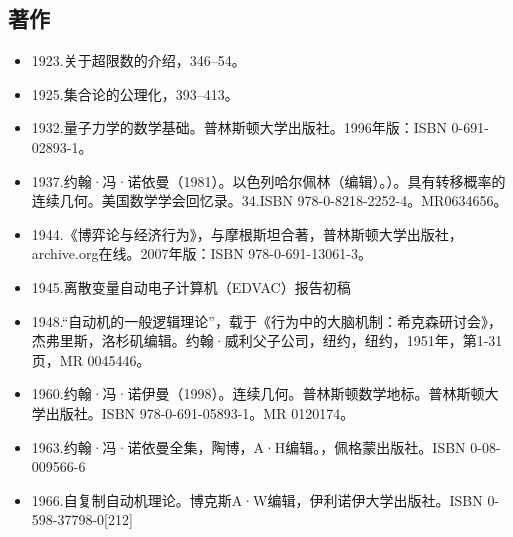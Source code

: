 \subsection{著作}
\begin{itemize}
\item 1923.关于超限数的介绍，346–54。
\item 1925.集合论的公理化，393–413。
\item 1932.量子力学的数学基础。普林斯顿大学出版社。1996年版：ISBN 0-691-02893-1。
\item 1937.约翰·冯·诺依曼（1981）。以色列哈尔佩林（编辑）。）。具有转移概率的连续几何。美国数学学会回忆录。34.ISBN 978-0-8218-2252-4。MR0634656。
\item 1944.《博弈论与经济行为》，与摩根斯坦合著，普林斯顿大学出版社，archive.org在线。2007年版：ISBN 978-0-691-13061-3。
\item 1945.离散变量自动电子计算机（EDVAC）报告初稿
\item 1948.“自动机的一般逻辑理论”，载于《行为中的大脑机制：希克森研讨会》，杰弗里斯，洛杉矶编辑。约翰·威利父子公司，纽约，纽约，1951年，第1-31页，MR 0045446。
\item 1960.约翰·冯·诺伊曼（1998）。连续几何。普林斯顿数学地标。普林斯顿大学出版社。ISBN 978-0-691-05893-1。MR 0120174。
\item 1963.约翰·冯·诺依曼全集，陶博，A·H编辑。，佩格蒙出版社。ISBN 0-08-009566-6
\item 1966.自复制自动机理论。博克斯A·W编辑，伊利诺伊大学出版社。ISBN 0-598-37798-0[212]
\end{itemize}

